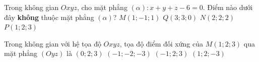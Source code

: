 \begin{ex}%
	Trong không gian $Oxyz$, cho mặt phẳng $(\alpha): x+y+z-6=0$. Điểm nào dưới đây \textbf{không} thuộc mặt phẳng $(\alpha)$?
	\choice
	{\True $M(1; -1; 1)$}
	{$Q(3; 3; 0)$}
	{$N(2; 2; 2)$}
	{$P(1; 2; 3)$}
\end{ex}
\begin{ex}%
	Trong không gian với hệ tọa độ $ Oxyz $, tọa độ điểm đối xứng của $ M(1;2;3) $ qua mặt phẳng $ (Oyz) $ là 
	\choice
	{$ (0;2;3) $}
	{$ (-1;-2;-3) $}
	{\True $ (-1;2;3) $}
	{$ (1;2;-3) $}
\end{ex}

